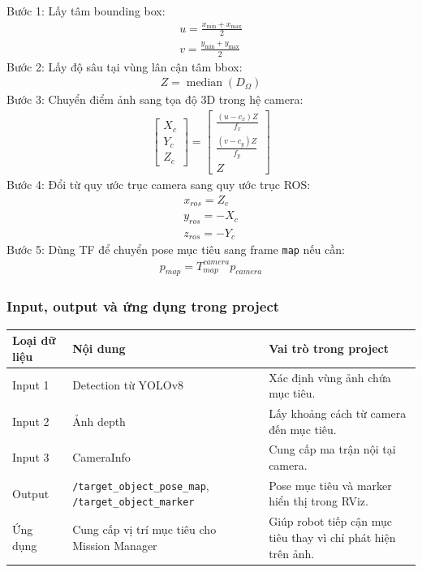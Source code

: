 Bước 1: Lấy tâm bounding box:
\begin{gather*}u = \frac{x_{\min} + x_{\max}}{2} \\[1.5ex]
v = \frac{y_{\min} + y_{\max}}{2}\end{gather*}
Bước 2: Lấy độ sâu tại vùng lân cận tâm bbox:
\begin{gather*}Z = \operatorname{median}\left( D_{\Omega} \right)\end{gather*}
Bước 3: Chuyển điểm ảnh sang tọa độ 3D trong hệ camera:
\begin{gather*}\begin{bmatrix}
X_{c} \\
Y_{c} \\
Z_{c}
\end{bmatrix} = \begin{bmatrix}
\frac{\left( u - c_{x} \right)Z}{f_{x}} \\
\frac{\left( v - c_{y} \right)Z}{f_{y}} \\
Z
\end{bmatrix}\end{gather*}
Bước 4: Đổi từ quy ước trục camera sang quy ước trục ROS:
\begin{gather*}x_{ros} = Z_{c} \\[1.5ex]
y_{ros} = - X_{c} \\[1.5ex]
z_{ros} = - Y_{c}\end{gather*}
Bước 5: Dùng TF để chuyển pose mục tiêu sang frame \texttt{map} nếu cần:
\begin{gather*}p_{map} = T_{map}^{camera}p_{camera}\end{gather*}
\subsubsection{Input, output và ứng dụng trong project}

\renewcommand{\arraystretch}{1.25}
\begin{longtable}{|
  >{\raggedright\arraybackslash}p{}|
  >{\raggedright\arraybackslash}p{}|
  >{\raggedright\arraybackslash}p{}|}
\hline
\textbf{Loại dữ liệu} & \textbf{Nội dung} & \textbf{Vai trò trong project} \\ \hline
\hline
\endhead
\hline
\endlastfoot
Input 1 & Detection từ YOLOv8 & Xác định vùng ảnh chứa mục tiêu. \\ \hline
Input 2 & Ảnh depth & Lấy khoảng cách từ camera đến mục tiêu. \\ \hline
Input 3 & CameraInfo & Cung cấp ma trận nội tại camera. \\ \hline
Output & \texttt{/target\_}\allowbreak\texttt{object\_}\allowbreak\texttt{pose\_map},
\texttt{/target\_object\_marker} & Pose mục tiêu và marker hiển thị
trong RViz. \\ \hline
Ứng dụng & Cung cấp vị trí mục tiêu cho Mission Manager & Giúp robot
tiếp cận mục tiêu thay vì chỉ phát hiện trên ảnh. \\ \hline
\end{longtable}

